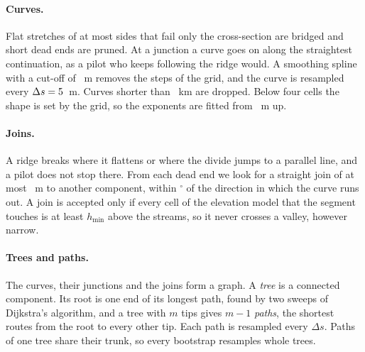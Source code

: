 \paragraph{Curves.} Flat stretches of at most \CgPBridgeSides{} sides that fail only the cross-section are bridged and short dead ends are
pruned. At a junction a curve goes on along the straightest continuation, as a pilot who keeps following the ridge would. A smoothing spline with a
cut-off of \CgPSmooth~m removes the steps of the grid, and the curve is resampled every $\Delta s=5$~m. Curves shorter than
\CgPMinLengthKm~km are dropped. Below four cells the shape is set by the grid, so the exponents are fitted from \CgPFitFrom~m up.

\paragraph{Joins.} A ridge breaks where it flattens or where the divide jumps to a parallel line, and a pilot does not stop there.
From each dead end we look for a straight join of at most \CgPJoinM~m to another component, within \CgPCone$^\circ$ of the direction in which the curve runs out. A join is accepted
only if every cell of the elevation model that the segment touches is at least $h_{\min}$ above the streams, so it never crosses a valley, however narrow.

\paragraph{Trees and paths.} The curves, their junctions and the joins form a graph. A \emph{tree} is a connected component. Its root
is one end of its longest path, found by two sweeps of Dijkstra's algorithm, and a tree with $m$ tips gives $m-1$ \emph{paths}, the shortest routes
from the root to every other tip. Each path is resampled every $\Delta s$. Paths of one tree share their trunk, so every bootstrap resamples whole trees.

